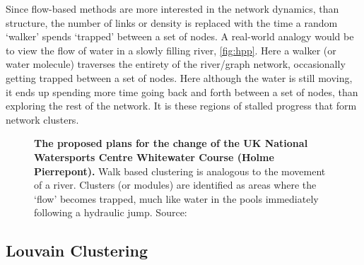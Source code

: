 Since flow-based methods are more interested in the network dynamics, than structure, the number of links or density is replaced with the time a random `walker' spends `trapped' between a set of nodes. A real-world analogy would be to view the flow of water in a slowly filling river, \autoref{fig:hpp}. Here a walker (or water molecule) traverses the entirety of the river/graph network, occasionally getting trapped between a set of nodes. Here although the water is still moving, it ends up spending more time going back and forth between a set of nodes, than exploring the rest of the network. It is these regions of stalled progress that form network clusters.

\begin{figure}[H]
    \centering
\caption{\textbf{The proposed plans for the change of the UK National Watersports Centre Whitewater Course (Holme Pierrepont).} Walk based clustering is analogous to the movement of a river. Clusters (or modules) are identified as areas where the `flow' becomes trapped, much like water in the pools immediately following a hydraulic jump. Source: \citep{hpp} }\label{fig:hpp}
\end{figure}

\subsection{Louvain Clustering}


